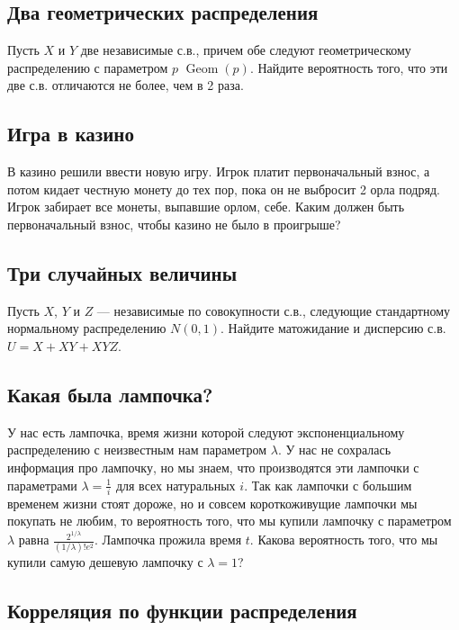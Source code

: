 \documentclass[12pt]{article}
\DeclareMathOperator{\Geom}{Geom}
\begin{document}
\subsection{Два геометрических распределения}

Пусть $X$ и $Y$ две независимые с.в., причем обе следуют геометрическому распределению с параметром $p$ $\Geom(p)$. Найдите вероятность того, что эти две с.в. отличаются не более, чем в 2 раза.



\subsection{Игра в казино}

В казино решили ввести новую игру. Игрок платит первоначальный взнос, а потом кидает честную монету до тех пор, пока он не выбросит 2 орла подряд. Игрок забирает все монеты, выпавшие орлом, себе. Каким должен быть первоначальный взнос, чтобы казино не было в проигрыше?



\subsection{Три случайных величины}

Пусть $X$, $Y$ и $Z$ --- независимые по совокупности с.в., следующие стандартному нормальному распределению $N(0, 1)$. Найдите матожидание и дисперсию с.в. $U = X + XY + XYZ$. 



\subsection{Какая была лампочка?}

У нас есть лампочка, время жизни которой следуют экспоненциальному распределению с неизвестным нам параметром $\lambda$. У нас не сохралась информация про лампочку, но мы знаем, что производятся эти лампочки с параметрами $\lambda = \frac{1}{i}$ для всех натуральных $i$. Так как лампочки с большим временем жизни стоят дороже, но и совсем короткоживущие лампочки мы покупать не любим, то вероятность того, что мы купили лампочку с параметром $\lambda$ равна $\frac{2^{1/\lambda}}{(1/\lambda)!e^2}$. Лампочка прожила время $t$. Какова вероятность того, что мы купили самую дешевую лампочку с $\lambda = 1$?




\subsection{Корреляция по функции распределения}
\end{document}
